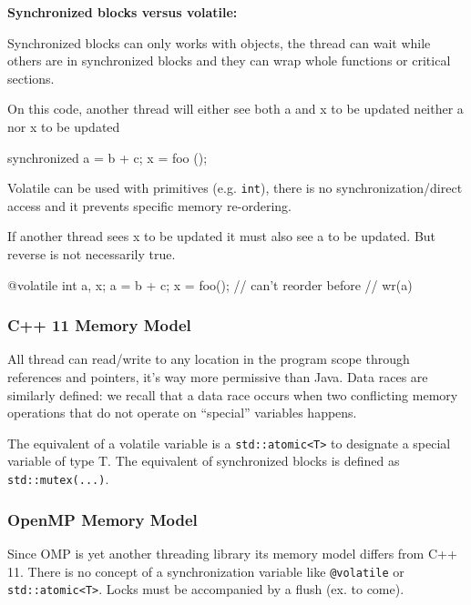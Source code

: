     \textbf{Synchronized blocks versus volatile:}
    \begin{tcolorbox}[gris]
    Synchronized blocks can only works with objects, the thread can wait while others are in synchronized blocks and they can wrap whole functions or critical sections.
    \begin{image}{On this code, another thread will either see both a and x to be updated neither a nor x to be updated}
        \begin{codeCenter}
        \begin{Ccode}
synchronized {
    a = b + c;
    x = foo ();
}
        \end{Ccode}
        \end{codeCenter}
    \end{image}
    \end{tcolorbox}
    \begin{tcolorbox}[gris]
        Volatile can be used with primitives (e.g. \lstinline!int!), there is no synchronization/direct access and it prevents specific memory re-ordering.
        \begin{image}{If another thread sees x to be updated it must also see a to be updated. But reverse is not necessarily true.}
            \begin{codeCenter}
            \begin{Ccode}
@volatile int a, x;
a = b + c;
x = foo();
// can't reorder before 
// wr(a)
            \end{Ccode}
            \end{codeCenter}
        \end{image}
    \end{tcolorbox}
\subsubsection{C++ 11 Memory Model}
    All thread can read/write to any location in the program scope through references and pointers, it's way more permissive than Java. Data races are similarly defined: we recall that a data race occurs when two conflicting memory operations that do not operate on ``special'' variables happens.  

    The equivalent of a volatile variable is a \lstinline!std::atomic<T>! to designate a special variable of type T. The equivalent of synchronized blocks is defined as \lstinline!std::mutex(...)!.
\subsubsection{OpenMP Memory Model}
    Since OMP is yet another threading library its memory model differs from C++ 11. There is no concept of a synchronization variable like \lstinline!@volatile! or \lstinline!std::atomic<T>!. Locks must be accompanied by a flush (ex. to come).

